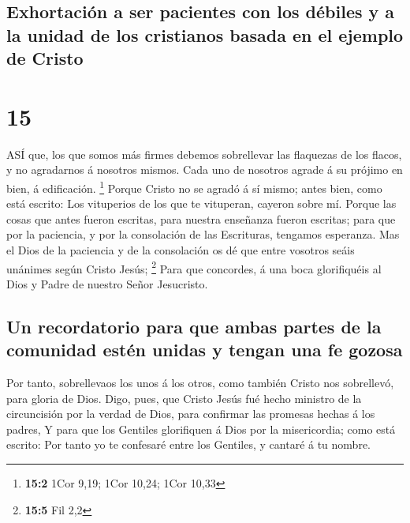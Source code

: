 \hypertarget{exhortaciuxf3n-a-ser-pacientes-con-los-duxe9biles-y-a-la-unidad-de-los-cristianos-basada-en-el-ejemplo-de-cristo}{%
\subsection{Exhortación a ser pacientes con los débiles y a la unidad de
los cristianos basada en el ejemplo de
Cristo}\label{exhortaciuxf3n-a-ser-pacientes-con-los-duxe9biles-y-a-la-unidad-de-los-cristianos-basada-en-el-ejemplo-de-cristo}}

\hypertarget{section-14}{%
\section{15}\label{section-14}}

 ASÍ que, los que somos más firmes debemos sobrellevar las
flaquezas de los flacos, y no agradarnos á nosotros mismos. 
Cada uno de nosotros agrade á su prójimo en bien, á edificación.
\footnote{\textbf{15:2} 1Cor 9,19; 1Cor 10,24; 1Cor 10,33} 
Porque Cristo no se agradó á sí mismo; antes bien, como está escrito:
Los vituperios de los que te vituperan, cayeron sobre mí. 
Porque las cosas que antes fueron escritas, para nuestra enseñanza
fueron escritas; para que por la paciencia, y por la consolación de las
Escrituras, tengamos esperanza.  Mas el Dios de la paciencia
y de la consolación os dé que entre vosotros seáis unánimes según Cristo
Jesús; \footnote{\textbf{15:5} Fil 2,2}  Para que concordes,
á una boca glorifiquéis al Dios y Padre de nuestro Señor Jesucristo.

\hypertarget{un-recordatorio-para-que-ambas-partes-de-la-comunidad-estuxe9n-unidas-y-tengan-una-fe-gozosa}{%
\subsection{Un recordatorio para que ambas partes de la comunidad estén
unidas y tengan una fe
gozosa}\label{un-recordatorio-para-que-ambas-partes-de-la-comunidad-estuxe9n-unidas-y-tengan-una-fe-gozosa}}

 Por tanto, sobrellevaos los unos á los otros, como también
Cristo nos sobrellevó, para gloria de Dios.  Digo, pues, que
Cristo Jesús fué hecho ministro de la circuncisión por la verdad de
Dios, para confirmar las promesas hechas á los padres,  Y
para que los Gentiles glorifiquen á Dios por la misericordia; como está
escrito: Por tanto yo te confesaré entre los Gentiles, y cantaré á tu
nombre.

